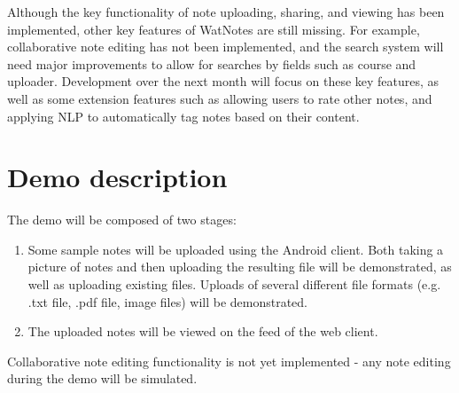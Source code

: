 \documentclass[12pt]{article}
\begin{document}
Although the key functionality of note uploading, sharing, and viewing has been implemented, other key features of WatNotes are still missing. For example, collaborative note editing has not been implemented, and the search system will need major improvements to allow for searches by fields such as course and uploader. Development over the next month will focus on these key features, as well as some extension features such as allowing users to rate other notes, and applying NLP to automatically tag notes based on their content.

\section{Demo description}
  The demo will be composed of two stages:
  \begin{enumerate}
    \item Some sample notes will be uploaded using the Android client. Both taking a picture of notes and then uploading the resulting file will be demonstrated, as well as uploading existing files. Uploads of several different file formats (e.g. .txt file, .pdf file, image files) will be demonstrated.

    \item The uploaded notes will be viewed on the feed of the web client.
  \end{enumerate}

  Collaborative note editing functionality is not yet implemented - any note editing during the demo will be simulated.

  \newpage
\end{document}

